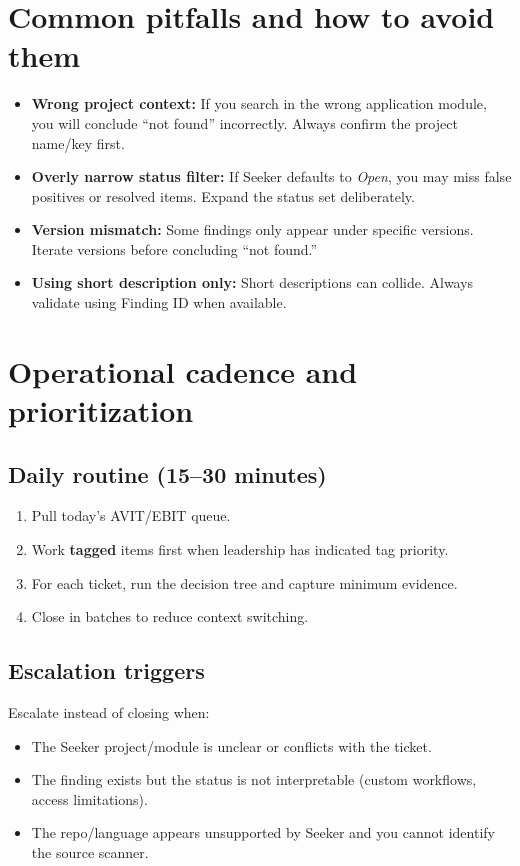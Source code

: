 \documentclass[11pt]{article}
\begin{document}
\section{Common pitfalls and how to avoid them}
\begin{itemize}[leftmargin=*]
  \item \textbf{Wrong project context:} If you search in the wrong application module, you will conclude ``not found'' incorrectly. Always confirm the project name/key first.
  \item \textbf{Overly narrow status filter:} If Seeker defaults to \textit{Open}, you may miss false positives or resolved items. Expand the status set deliberately.
  \item \textbf{Version mismatch:} Some findings only appear under specific versions. Iterate versions before concluding ``not found.''
  \item \textbf{Using short description only:} Short descriptions can collide. Always validate using Finding ID when available.
\end{itemize}

\section{Operational cadence and prioritization}
\subsection*{Daily routine (15--30 minutes)}
\begin{enumerate}[leftmargin=*]
  \item Pull today’s AVIT/EBIT queue.
  \item Work \textbf{tagged} items first when leadership has indicated tag priority.
  \item For each ticket, run the decision tree and capture minimum evidence.
  \item Close in batches to reduce context switching.
\end{enumerate}

\subsection*{Escalation triggers}
Escalate instead of closing when:
\begin{itemize}[leftmargin=*]
  \item The Seeker project/module is unclear or conflicts with the ticket.
  \item The finding exists but the status is not interpretable (custom workflows, access limitations).
  \item The repo/language appears unsupported by Seeker and you cannot identify the source scanner.
\end{itemize}
\end{document}
